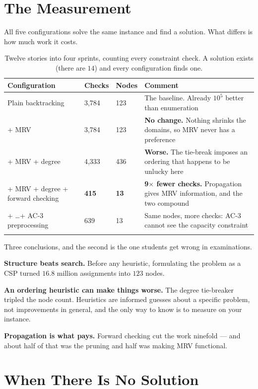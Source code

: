 \section{The Measurement}

All five configurations solve the same instance and find a solution. What differs
is how much work it costs.

\smallskip
\noindent\begin{longtable}{@{}L{6.0cm}L{2.3cm}L{2.0cm}L{4.4cm}@{}}
\toprule
{}
\textbf{Configuration} & \textbf{Checks} & \textbf{Nodes} & \textbf{Comment} \\
\midrule
\endhead
Plain backtracking & 3{,}784 & 123 & The baseline. Already $10^{5}$ better than
enumeration \\
\quad + MRV & 3{,}784 & 123 & \textbf{No change.} Nothing shrinks the domains, so
MRV never has a preference \\
\quad + MRV + degree & 4{,}333 & 436 & \textbf{Worse.} The tie-break imposes an
ordering that happens to be unlucky here \\
\quad + MRV + degree + forward checking & \textbf{415} & \textbf{13} &
\textbf{9$\times$ fewer checks.} Propagation gives MRV information, and the two
compound \\
\quad + \ldots + AC-3 preprocessing & 639 & 13 & Same nodes, more checks: AC-3
cannot see the capacity constraint \\
\bottomrule
\caption{Twelve stories into four sprints, counting every constraint check. A
solution exists (there are $14$) and every configuration finds one.}
\label{tab:csp}
\end{longtable}

Three conclusions, and the second is the one students get wrong in examinations.

\textbf{Structure beats search.} Before any heuristic, formulating the problem as a
CSP turned $16.8$ million assignments into $123$ nodes.

\textbf{An ordering heuristic can make things worse.} The degree tie-breaker
tripled the node count. Heuristics are informed guesses about a specific problem,
not improvements in general, and the only way to know is to measure on your
instance.

\textbf{Propagation is what pays.} Forward checking cut the work ninefold --- and
about half of that was the pruning and half was making MRV functional.

\section{When There Is No Solution}

